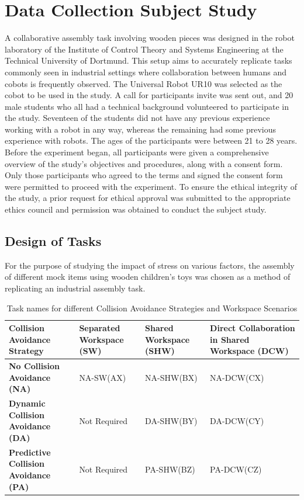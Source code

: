 \chapter{Data Collection Subject Study}

A collaborative assembly task involving wooden pieces was designed in the robot laboratory of the Institute of Control Theory and Systems Engineering at the Technical University of Dortmund. This setup aims to accurately replicate tasks commonly seen in industrial settings where collaboration between humans and cobots is frequently observed. The Universal Robot UR10 was selected as the cobot to be used in the study. A call for participants invite was sent out, and 20 male students who all had a technical background volunteered to participate in the study. Seventeen of the students did not have any previous experience working with a robot in any way, whereas the remaining
had some previous experience with robots. The ages of the participants were between 21 to 28 years. Before the experiment began, all participants were given a comprehensive overview of the study's objectives and procedures, along with a consent form. Only those participants who agreed to the terms and signed the consent form were permitted to proceed with the experiment. To ensure the ethical integrity of the study, a prior request for ethical approval was submitted to the appropriate ethics council and permission was obtained to conduct the subject study.

\section{Design of Tasks}
For the purpose of studying the impact of stress on various factors, the assembly of different mock items using wooden children's toys was chosen as a method of replicating an industrial assembly task.

\begin{table}[h]
    \centering
    \renewcommand{\arraystretch}{2}
    \begin{tabular}{|p{3cm}|p{3cm}|p{3cm}|p{5cm}|}
    \hline
    \textbf{Collision Avoidance Strategy} & \textbf{Separated Workspace (SW)} & \textbf{Shared Workspace (SHW)} & \textbf{Direct Collaboration in Shared Workspace (DCW)} \\ \hline
    \textbf{No Collision Avoidance (NA)} & NA-SW(AX) & NA-SHW(BX) & NA-DCW(CX) \\ \hline
    \textbf{Dynamic Collision Avoidance (DA)} & Not Required & DA-SHW(BY) & DA-DCW(CY) \\ \hline
    \textbf{Predictive Collision Avoidance (PA)} & Not Required & PA-SHW(BZ) & PA-DCW(CZ) \\ \hline
    \end{tabular}
    \caption{Task names for different Collision Avoidance Strategies and Workspace Scenarios}
    \label{table:tasks}
\end{table}


